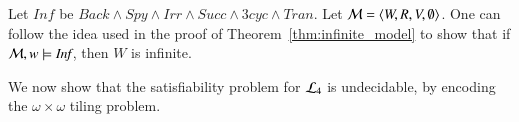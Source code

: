 \begin{pf}
Let $\textit{Inf}$ be $\textit{Back} \land \textit{Spy} \land
\textit{Irr} \land \textit{Succ} \land \textit{3cyc} \land
\textit{Tran}$. Let $\mathcal{M}=\langle W, R, V, \emptyset \rangle$. One can
follow the idea used in the proof of
Theorem~\ref{thm:infinite_model} to show that if $\mathcal{M}, w \models
\textit{Inf}$, then $W$ is infinite.
%
%
\end{pf}


We now show that the satisfiability problem for $\mathcal{L}_4$ is
undecidable, by encoding the $\omega \times \omega$ tiling problem.


